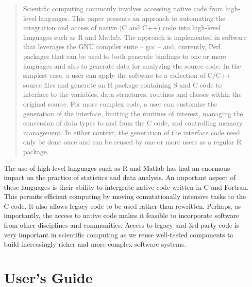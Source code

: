 \documentclass{article}
\begin{document}
\begin{abstract}

  Scientific computing commonly involves accessing native code from
  high-level languages. This paper presents an approach to automating
  the integration and access of native (C and C++) code into
  high-level languages such as R and Matlab.  The approach is
  implemented in software that leverages the GNU compiler suite -- gcc
  -- and, currently, Perl packages that can be used to both generate
  bindings to one or more languages and also to generate data for
  analyzing the source code.  In the simplest case, a user can apply
  the software to a collection of C/C++ source files and generate an R
  package containing S and C code to interface to the variables, data
  structures, routines and classes within the original source.
  For more complex code, a user can customize the generation of the
  interface, limiting the routines of interest, managing the
  conversion of data types to and from the C code, and controlling
  memory management.
  In either context, the generation of the interface code need only be
  done once and can be reused by one or more users as a regular R
  package.

\end{abstract}


  The use of high-level languages such as R and Matlab has
  had an enormous impact on the practice of statistics and data
  analysis.  An important aspect of these languages is their ability
  to intergrate native code written in C and Fortran. 
  This permits   efficient computing by moving comutationally intensive tasks to 
 the C code.  It also allows legacy code to be used rather than rewritten.
  Perhaps, as importantly, the access to native code 
  makes it feasible to incorporate software from other disciplines and
  communities.  Access to legacy and 3rd-party code is very
  important in scientific computing as we reuse well-tested components
  to build  increasingly richer and more complex software systems.


\section{User's Guide}
\end{document}
